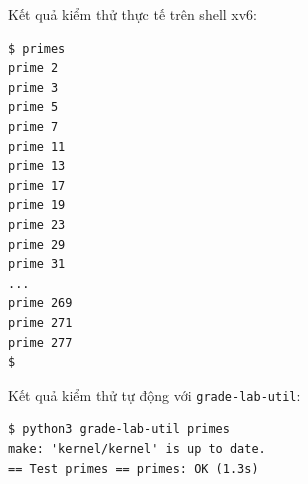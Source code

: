 \noindent Kết quả kiểm thử thực tế trên shell xv6:

\begin{center}
\begin{minipage}{0.86\textwidth}
\begin{lstlisting}[numbers=none,xleftmargin=0pt,framexleftmargin=0pt]
$ primes
prime 2
prime 3
prime 5
prime 7
prime 11
prime 13
prime 17
prime 19
prime 23
prime 29
prime 31
...
prime 269
prime 271
prime 277
$
\end{lstlisting}
\end{minipage}
\end{center}

\noindent Kết quả kiểm thử tự động với \texttt{grade-lab-util}:

\begin{center}
\begin{minipage}{0.86\textwidth}
\begin{lstlisting}[numbers=none,xleftmargin=0pt,framexleftmargin=0pt]
$ python3 grade-lab-util primes
make: 'kernel/kernel' is up to date.
== Test primes == primes: OK (1.3s) 
\end{lstlisting}
\end{minipage}
\end{center}
